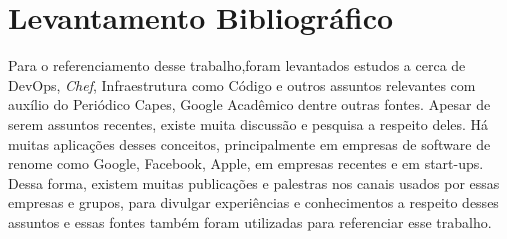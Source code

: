 \section{Levantamento Bibliográfico}

Para o referenciamento desse trabalho,foram levantados estudos a cerca de
DevOps, \textit{Chef}, Infraestrutura como Código e outros assuntos relevantes com
auxílio do Periódico Capes, Google Acadêmico dentre outras fontes.
Apesar de serem assuntos recentes, existe muita discussão e pesquisa a
respeito deles. Há muitas aplicações desses conceitos, principalmente
em empresas de software de renome como Google, Facebook, Apple, em
empresas recentes e em start-ups. Dessa forma, existem muitas publicações e
palestras nos canais usados por essas empresas e grupos, para divulgar
experiências e conhecimentos a respeito desses assuntos e essas fontes
também foram utilizadas para referenciar esse trabalho. 
